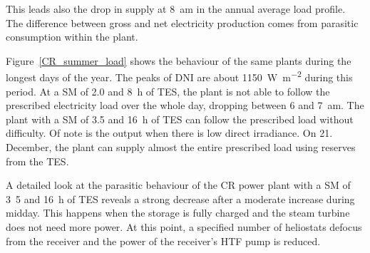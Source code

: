 This leads also the drop in supply at \SI{8}{am} in the annual average load profile. The difference between gross and net electricity production comes from parasitic consumption within the plant.

Figure~\ref{CR_summer_load} shows the behaviour of the same plants during the longest days of the year. The peaks of DNI are about \SI{1150}{\watt\per\square\metre} during this period. At a SM of 2.0 and \SI{8}{h} of TES, the plant is not able to follow the prescribed electricity load over the whole day, dropping between 6 and \SI{7}{am}. The plant with a SM of 3.5 and \SI{16}{h} of TES can follow the prescribed load without difficulty. Of note is the output when there is low direct irradiance. On 21. December, the plant can supply almost the entire prescribed load using reserves from the TES.


A detailed look at the parasitic behaviour of the CR power plant with a SM of \si{3.5} and \SI{16}{h} of TES reveals a strong decrease after a moderate increase during midday. This happens when the storage is fully charged and the steam turbine does not need more power. At this point, a specified number of heliostats defocus from the receiver and the power of the receiver's HTF pump is reduced. 

